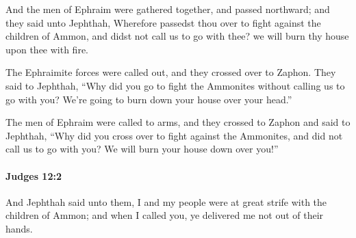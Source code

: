 			\begin{versebox}
					\item[BHS] 
					\item[ASV] And the men of Ephraim were gathered together, and passed northward; and they said unto Jephthah, Wherefore passedst thou over to fight against the children of Ammon, and didst not call us to go with thee? we will burn thy house upon thee with fire.
					\item[NIV] The Ephraimite forces were called out, and they crossed over to Zaphon. They said to Jephthah, “Why did you go to fight the Ammonites without calling us to go with you? We’re going to burn down your house over your head.”
					\item[NRSV] The men of Ephraim were called to arms, and they crossed to Zaphon and said to Jephthah, “Why did you cross over to fight against the Ammonites, and did not call us to go with you? We will burn your house down over you!”
			\end{versebox}

		\paragraph{Judges 12:2} %
			\label{JUDGES-12-2}

			And Jephthah said unto them, I and my people were at great strife with the children of Ammon; and when I called you, ye delivered me not out of their hands.


